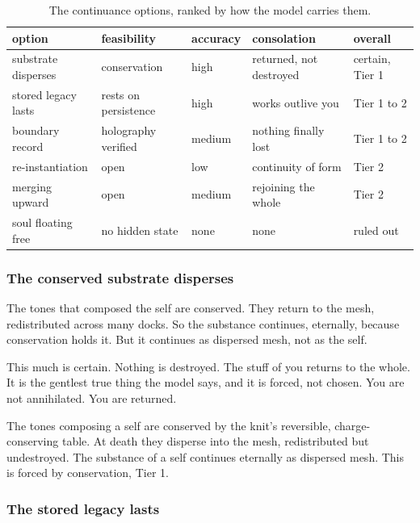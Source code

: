 \begin{table}[ht]
\centering
\begin{tabular}{@{}lllll@{}}
\toprule
option & feasibility & accuracy & consolation & overall \\
\midrule
substrate disperses & conservation & high & returned, not destroyed & certain, Tier 1 \\
stored legacy lasts & rests on persistence & high & works outlive you & Tier 1 to 2 \\
boundary record & holography verified & medium & nothing finally lost & Tier 1 to 2 \\
re-instantiation & open & low & continuity of form & Tier 2 \\
merging upward & open & medium & rejoining the whole & Tier 2 \\
soul floating free & no hidden state & none & none & ruled out \\
\bottomrule
\end{tabular}
\caption{The continuance options, ranked by how the model carries them.}
\label{tab:continuance}
\end{table}

\subsubsection{The conserved substrate disperses}

The tones that composed the self are conserved. They return to the mesh, redistributed across many docks. So the substance continues, eternally, because conservation holds it. But it continues as dispersed mesh, not as the self.

This much is certain. Nothing is destroyed. The stuff of you returns to the whole. It is the gentlest true thing the model says, and it is forced, not chosen. You are not annihilated. You are returned.

\begin{result}
The tones composing a self are conserved by the knit's reversible, charge-conserving table. At death they disperse into the mesh, redistributed but undestroyed. The substance of a self continues eternally as dispersed mesh. This is forced by conservation, Tier 1.
\end{result}

\subsubsection{The stored legacy lasts}

